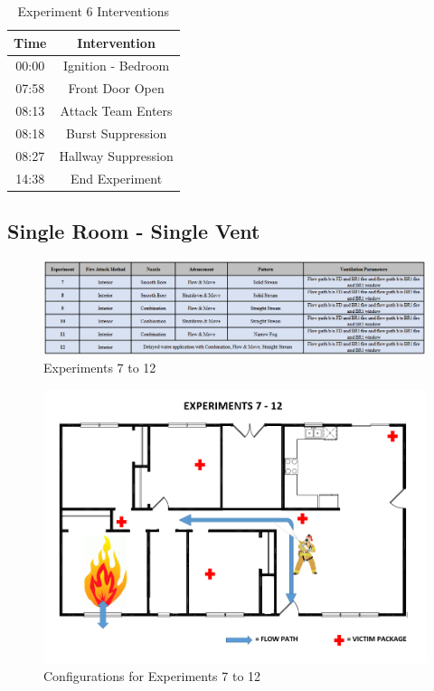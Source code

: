 \documentclass[12pt,oneside]{book}
\begin{document}
\begin{table}[H]
	\centering
	\caption{Experiment 6 Interventions}
	\begin{tabular}{|c|c|} 
		\hline
		Time & Intervention \\ \hline \hline
		00:00 & Ignition - Bedroom \\ \hline
		07:58 & Front Door Open \\ \hline
		08:13 & Attack Team Enters\\ \hline
		08:18 & Burst Suppression \\ \hline 
		08:27 & Hallway Suppression \\ \hline
		14:38 & End Experiment\\ \hline
	\end{tabular}
	\label{Table:Exp6Interventions}
\end{table}

\clearpage

\subsection{Single Room - Single Vent}

\begin{figure}[H]
	\centering
	\includegraphics[width=7in]{Figures/General/Exp7to12.png}
	\caption{Experiments 7 to 12}
	\label{fig:Exp7to12}
\end{figure}

\begin{figure}[H]
	\centering
	\includegraphics[width=5in]{Figures/General/Exps7through12.png}
	\caption{Configurations for Experiments 7 to 12}
	\label{fig:ExpConfig7to12}
\end{figure}
\end{document}
